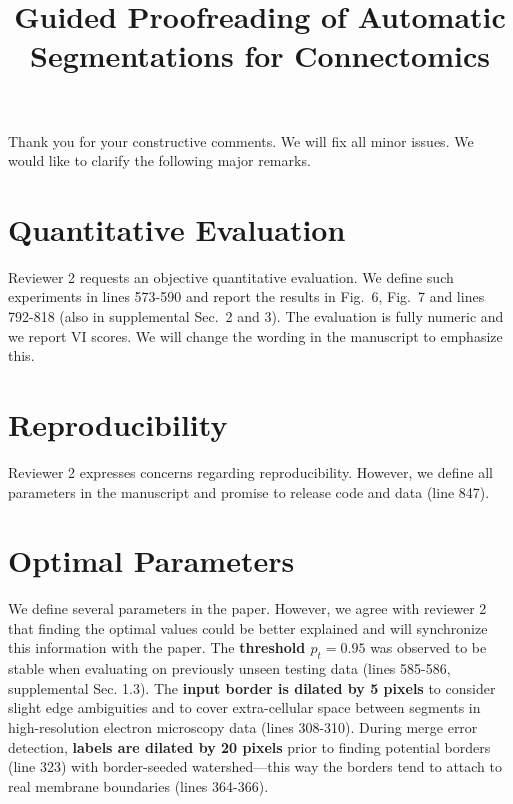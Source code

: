 \documentclass[10pt,twocolumn,letterpaper]{article}
\begin{document}
\title{Guided Proofreading of Automatic Segmentations for Connectomics}  %

\maketitle
\thispagestyle{empty}

Thank you for your constructive comments. We will fix all minor issues. We would like to clarify the following major remarks.

\section{Quantitative Evaluation}
Reviewer 2 requests an objective quantitative evaluation. We define such experiments in lines 573-590 and report the results in Fig.~6, Fig.~7 and lines 792-818 (also in supplemental Sec.~2 and 3). The evaluation is fully numeric and we report VI scores. We will change the wording in the manuscript to emphasize this.

\section{Reproducibility}
Reviewer 2 expresses concerns regarding reproducibility. However, we define all parameters in the manuscript and promise to release code and data (line 847).

\section{Optimal Parameters}
We define several parameters in the paper. However, we agree with reviewer 2 that finding the optimal values could be better explained and will synchronize this information with the paper. 
The \textbf{threshold $p_t=0.95$} was observed to be stable when evaluating on previously unseen testing data (lines 585-586, supplemental Sec. 1.3). The \textbf{input border is dilated by 5 pixels} to consider slight edge ambiguities and to cover extra-cellular space between segments in high-resolution electron microscopy data (lines 308-310). During merge error detection, \textbf{labels are dilated by 20 pixels} prior to finding potential borders (line 323) with border-seeded watershed---this way the borders tend to attach to real membrane boundaries (lines 364-366). 
\end{document}
